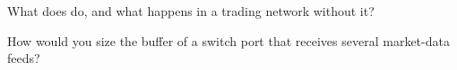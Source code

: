 \begin{interviewq}\label{iq:nw:networking-for-trading:5}
What does  do, and what happens in a trading network without it?
\end{interviewq}

\begin{interviewq}\label{iq:nw:networking-for-trading:6}
How would you size the buffer of a switch port that receives several market-data feeds?
\end{interviewq}
